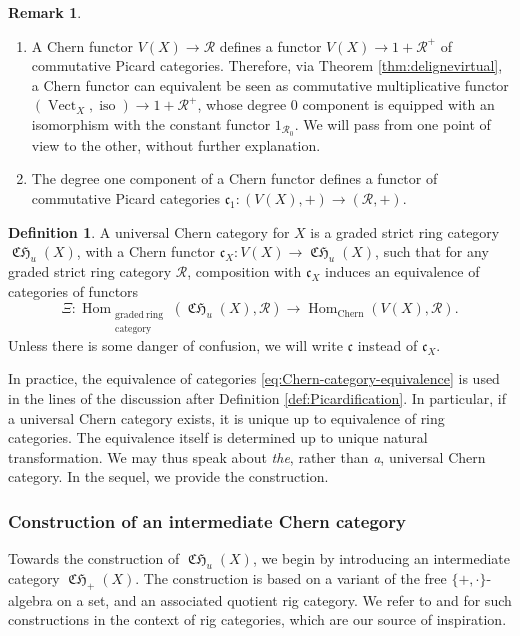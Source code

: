 \documentclass[JEP,XML,SOM,Unicode,published]{cedram}
\theoremstyle{plain}
\theoremstyle{definition}
\newtheorem{definition}[theorem]{Definition}
\newtheorem{remark}[theorem]{Remark}
\newcommand{\Rcal}{\mathcal R}
\newcommand{\cfrak}{\mathfrak c}
\DeclareMathOperator{\CHfrak}{\mathfrak{CH}}
\DeclareMathOperator{\Hom}{Hom}
\DeclareMathOperator{\iso}{iso}
\DeclareMathOperator{\Vect}{Vect}
\begin{document}
\skpt
\begin{remark}\label{rmk:superficial-remarks-Chern-functors}
\begin{enumerate}
\item\label{rmk:supremChfun-1} A Chern functor $ V(X)\to\Rcal$ defines a functor $V(X)\to 1+\Rcal^{+}$ of commutative Picard categories. Therefore, via Theorem \ref{thm:delignevirtual}, a Chern functor can equivalent be seen as commutative multiplicative functor $(\Vect_{X},\iso)\to 1+\Rcal^{+}$, whose degree 0 component is equipped with an isomorphism with the constant functor $1_{\Rcal_{0}}$. We will pass from one point of view to the other, without further explanation.
\item\label{rmk:supremChfun-2} The degree one component of a Chern functor defines a functor of commutative Picard categories $\cfrak_{1}\colon (V(X),+)\to (\Rcal,+)$.
\end{enumerate}
\end{remark}

\begin{definition}\label{def:universal-chern-category}
A universal Chern category for $X$ is a graded strict ring category $\CHfrak_{u}(X)$, with a Chern functor $\cfrak_{X}\colon V(X)\to\CHfrak_{u}(X)$, such that for any graded strict ring category $\Rcal$, composition with $\cfrak_{X}$ induces an equivalence of categories of functors
\begin{equation}\label{eq:Chern-category-equivalence}
\Xi: \Hom_{\substack{\mathrm{graded\ ring}\\ \mathrm{category}}}(\CHfrak_{u}(X), \Rcal) \to \Hom_{\mathrm{Chern}}(V(X), \Rcal).
\end{equation}
Unless there is some danger of confusion, we will write $\cfrak$ instead of $\cfrak_{X}$.
\end{definition}

In practice, the equivalence of categories \eqref{eq:Chern-category-equivalence} is used in the lines of the discussion after Definition \ref{def:Picardification}. In particular, if a universal Chern category exists, it is unique up to equivalence of ring categories. The equivalence itself is determined up to unique natural transformation. We may thus speak about \emph{the}, rather than \emph{a}, universal Chern category. In the sequel, we provide the construction.

\subsubsection{Construction of an intermediate Chern category}\label{subsubsec:intermediate-category} Towards the construction of $\CHfrak_{u}(X)$, we begin by introducing an intermediate category $\CHfrak_{+}(X)$. The construction is based on a variant of the free $\lbrace +,\cdot\rbrace$-algebra on a set, and an associated quotient rig category. We refer to \cite[]{Laplaza} and \cite[Volume I, Chapter 3]{Johnson-Yau} for such constructions in the context of rig categories, which are our source of inspiration.
\end{document}
